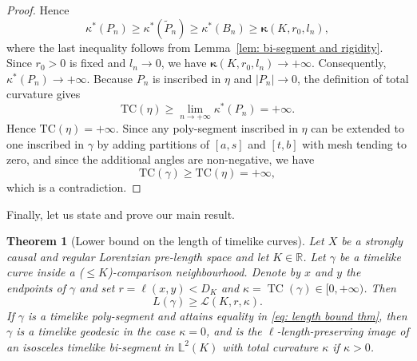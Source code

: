 \documentclass[hidelinks,12pt,a4paper]{article}
\numberwithin{equation}{section}
\theoremstyle{plain}
\newtheorem{theorem}[definition]{Theorem}
\theoremstyle{definition}
\newcommand{\R}{\mathbb R}
\DeclareMathOperator{\TC}{TC}
\newcommand{\lm}[1]{\mathbb{L}^2(#1)}
\newcommand{\LpLS}{Lo\-rentz\-ian pre-length space }
\begin{document}
\begin{proof}
Hence
\begin{equation*}
    \kappa^*(P_n)\geq \kappa^*(\widetilde P_n)\geq \kappa^*(B_n) \geq \bm{\kappa}(K,r_0,l_n),
\end{equation*}
where the last inequality follows from Lemma~\ref{lem: bi-segment and rigidity}.  Since $r_0>0$ is fixed and $l_n\to 0$, we have $\bm{\kappa}(K,r_0,l_n)\to+\infty$. Consequently, $\kappa^*(P_n)\to+\infty$.
Because $P_n$ is inscribed in $\eta$ and $|P_n|\to 0$, the definition of total curvature gives
\begin{equation*}
    \mathrm{TC}(\eta)\geq \lim_{n\to+\infty} \kappa^*(P_n)=+\infty.
\end{equation*}
Hence $\mathrm{TC}(\eta)=+\infty.$ Since any poly-segment inscribed in $\eta$ can be extended to one inscribed in $\gamma$ by adding partitions of $[a,s]$ and $[t,b]$ with mesh tending to zero, and since the additional angles are non-negative, we have 
\begin{equation*}
    \mathrm{TC}(\gamma)\geq \mathrm{TC}(\eta)=+\infty,
\end{equation*}
which is a contradiction.
\end{proof}

Finally, let us state and prove our main result. 

\begin{theorem}[Lower bound on the length of timelike curves]
\label{main theorem}
Let $X$ be a strongly causal and regular \LpLS and let $K \in \R$. 
Let $\gamma$ be a timelike curve inside a ($\leq K$)-comparison neighbourhood. 
Denote by $x$ and $y$ the endpoints of $\gamma$ and set $r=\ell(x,y)<D_K$ and $\kappa=\TC(\gamma)\in [0,+\infty)$. 
Then 
\begin{equation}
\label{eq: length bound thm}
    L(\gamma) \geq \mathcal{L}(K,r,\kappa).
\end{equation}
If $\gamma$ is a timelike poly-segment and attains equality in \eqref{eq: length bound thm}, then $\gamma$ is a timelike geodesic in the case $\kappa=0$, and is the $\ell$-length-preserving image of an isosceles timelike bi-segment in $\lm K$ with total curvature $\kappa$ if $\kappa>0$.
\end{theorem}
\end{document}
